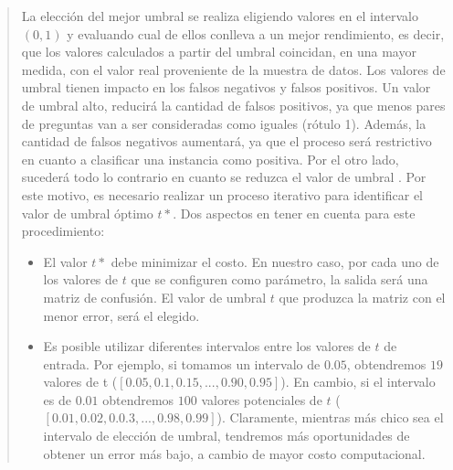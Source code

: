 \begin{quotation}
La elección del mejor umbral se realiza eligiendo valores en el intervalo \((0,1)\) y evaluando cual de ellos conlleva a un mejor rendimiento, es decir, que los valores calculados a partir del umbral coincidan, en una mayor medida, con el valor real proveniente de la muestra de datos. Los valores de umbral tienen impacto en los falsos negativos y falsos positivos. Un valor de umbral alto, reducirá la cantidad de falsos positivos, ya que menos pares de preguntas van a ser consideradas como iguales (rótulo 1). Además, la cantidad de falsos negativos aumentará, ya que el proceso será restrictivo en cuanto a clasificar una instancia como positiva. Por el otro lado, sucederá todo lo contrario en cuanto se reduzca el valor de umbral \citep{fernandez2018learning}. Por este motivo, es necesario realizar un proceso iterativo para identificar el valor de umbral óptimo \(t*\). Dos aspectos en tener en cuenta para este procedimiento:
\begin{itemize}
	\item El valor \(t*\) debe minimizar el costo. En nuestro caso, por cada uno de los valores de \(t\) que se configuren como parámetro, la salida será una matriz de confusión. El valor de umbral \(t\) que produzca la matriz con el menor error, será el elegido.
	\item Es posible utilizar diferentes intervalos entre los valores de \(t\) de entrada. Por ejemplo, si tomamos un intervalo de \(0.05\), obtendremos \(19\) valores de t (\([0.05, 0.1, 0.15, ..., 0.90, 0.95]\)). En cambio, si el intervalo es de \(0.01\) obtendremos \(100\) valores potenciales de \(t\) (\([0.01, 0.02, 0.0.3, ..., 0.98, 0.99]\)). Claramente, mientras más chico sea el intervalo de elección de umbral, tendremos más oportunidades de obtener un error más bajo, a cambio de mayor costo computacional.
\end{itemize}
\end{quotation}
